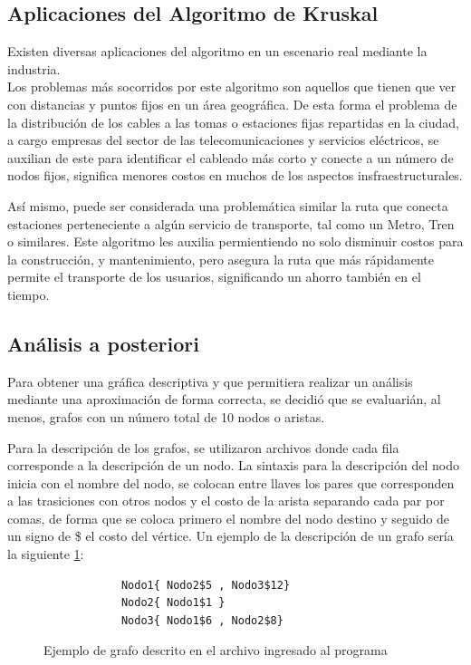 \subsection*{Aplicaciones del Algoritmo de Kruskal}

    Existen diversas aplicaciones del algoritmo en un escenario real mediante la industria.\\
    
    Los problemas más socorridos por este algoritmo son aquellos que tienen que ver con distancias y puntos fijos en un área geográfica. De esta forma el problema de la distribución de los cables a las tomas o estaciones fijas repartidas en la ciudad, a cargo empresas del sector de las telecomunicaciones y servicios eléctricos, se auxilian de este para identificar el cableado más corto y conecte a un número de nodos fijos, significa menores costos en muchos de los aspectos insfraestructurales.
    
    Así mismo, puede ser considerada una problemática similar la ruta que conecta estaciones perteneciente a algún servicio de transporte, tal como un Metro, Tren o similares. Este algoritmo les auxilia permientiendo no solo disminuir costos para la construcción, y mantenimiento, pero asegura la ruta que más rápidamente permite el transporte de los usuarios, significando un ahorro también en el tiempo.

\subsection*{Análisis a posteriori}
    Para obtener una gráfica descriptiva y que permitiera realizar un análisis mediante una aproximación de forma correcta, se decidió que se evaluarián, al menos, grafos con un número total de 10 nodos o aristas.
    
    Para la descripción de los grafos, se utilizaron archivos donde cada fila corresponde a la descripción de un nodo. La sintaxis para la descripción del nodo inicia con el nombre del nodo, se colocan entre llaves los pares que corresponden a las trasiciones con otros nodos y el costo de la arista separando cada par por comas, de forma que se coloca primero el nombre del nodo destino y seguido de un signo de \$ el costo del vértice. Un ejemplo de la descripción de un grafo sería la siguiente \ref{GrafoEjemplo}:
    \begin{figure}[h!]
        \centering
        \begin{verbatim}
            Nodo1{ Nodo2$5 , Nodo3$12}
            Nodo2{ Nodo1$1 }
            Nodo3{ Nodo1$6 , Nodo2$8}\end{verbatim}
        \caption{Ejemplo de grafo descrito en el archivo ingresado al programa}
        \label{GrafoEjemplo}
    \end{figure}
    
